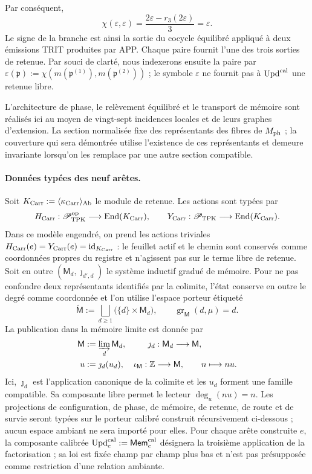 Par conséquent,
\begin{equation}
 \chi(\varepsilon,\varepsilon)
 =\frac{2\varepsilon-r_3(2\varepsilon)}3=\varepsilon.
 \label{hmtfg:eq:carry-no-parametrico-ch}
\end{equation}
Le signe de la branche est ainsi la sortie du cocycle équilibré appliqué à deux
émissions TRIT produites par APP. Chaque paire fournit l’une des trois
sorties de retenue. Par souci de clarté, nous indexerons ensuite la paire par
\(\varepsilon(\mathfrak p):=
\chi(m(\mathfrak p^{(1)}),m(\mathfrak p^{(2)}))\) ; le symbole
\(\varepsilon\) ne fournit pas à \(\operatorname{Upd}^{\rm cal}\) une retenue libre.

L’architecture de phase, le relèvement équilibré et le transport de
mémoire sont réalisés ici au moyen de vingt-sept incidences locales et de leurs
graphes d’extension. La section normalisée fixe des représentants des
fibres de \(M_{\rm ph}\) ; la couverture qui sera démontrée utilise l’existence
de ces représentants et demeure invariante lorsqu’on les remplace par une autre
section compatible.

\paragraph{Données typées des neuf arêtes.}
Soit
\(K_{\rm Carr}:=\langle\kappa_{\rm Carr}\rangle_{\rm Ab}\) le module de
retenue. Les actions sont typées par
\[
 H_{\rm Carr}:\mathscr P_{\rm TPK}^{\rm op}
   \longrightarrow\operatorname{End}(K_{\rm Carr}),\qquad
 Y_{\rm Carr}:\mathscr P_{\rm TPK}
   \longrightarrow\operatorname{End}(K_{\rm Carr}).
\]
Dans ce modèle engendré, on prend les actions triviales \(H_{\rm Carr}(e)=Y_{\rm Carr}(e)=\operatorname{id}_{K_{\rm Carr}}\) : le feuillet actif et le chemin sont conservés comme coordonnées propres du registre et n'agissent pas sur le terme libre de retenue. Soit en outre \((\mathsf M_d,\jmath_{d',d})\) le système inductif gradué de mémoire. Pour ne pas confondre deux représentants identifiés par la colimite, l'état conserve en outre le degré comme coordonnée et l'on utilise l'espace porteur étiqueté
\[
 \widetilde{\mathsf M}:=
 \bigsqcup_{d\ge1}\bigl(\{d\}\times\mathsf M_d\bigr),
 \qquad
 \operatorname{gr}_{\mathsf M}(d,\mu)=d.
\]
La publication dans la mémoire limite est donnée par
\[
\begin{aligned}
 \mathsf M&:=\varinjlim_d\mathsf M_d,&
 \jmath_d&:\mathsf M_d\longrightarrow\mathsf M,\\
 u&:=\jmath_d(u_d),&
 \iota_{\mathsf M}:\mathbb Z&\longrightarrow\mathsf M,
 \qquad n\longmapsto nu .
\end{aligned}
\]
Ici, \(\jmath_d\) est l’application canonique de la colimite et les \(u_d\) forment une
famille compatible. Sa composante libre permet
le lecteur \(\deg_u(nu)=n\).
Les projections de configuration, de phase, de mémoire, de retenue, de route et de
survie seront typées sur le porteur calibré construit
récursivement ci-dessous ; aucun espace ambiant ne sera importé pour elles.
Pour chaque arête construite \(e\), la
composante calibrée
\(\operatorname{Upd}^{\rm cal}_e:=\mathsf{Mem}^{\rm cal}_e\) désignera la
troisième application de la factorisation ; sa loi est fixée champ par champ plus
bas et n’est pas présupposée comme restriction d’une relation ambiante.

